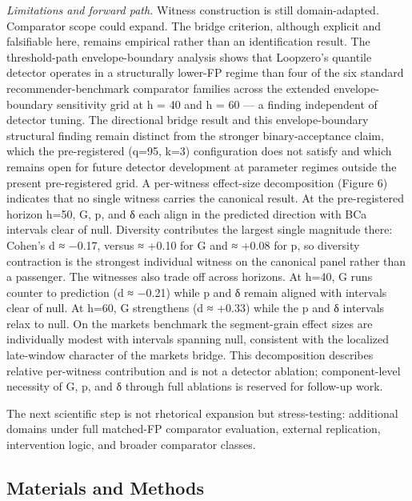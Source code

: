 \documentclass[
  11pt,
]{article}
\begin{document}
\emph{Limitations and forward path.} Witness construction is still
domain-adapted. Comparator scope could expand. The bridge criterion,
although explicit and falsifiable here, remains empirical rather than an
identification result. The threshold-path envelope-boundary analysis
shows that Loopzero's quantile detector operates in a structurally
lower-FP regime than four of the six standard recommender-benchmark
comparator families across the extended envelope-boundary sensitivity
grid at h = 40 and h = 60 --- a finding independent of detector tuning.
The directional bridge result and this envelope-boundary structural
finding remain distinct from the stronger binary-acceptance claim, which
the pre-registered (q=95, k=3) configuration does not satisfy and which
remains open for future detector development at parameter regimes
outside the present pre-registered grid. A per-witness effect-size
decomposition (Figure 6) indicates that no single witness carries the
canonical result. At the pre-registered horizon h=50, G, p, and δ each
align in the predicted direction with BCa intervals clear of null.
Diversity contributes the largest single magnitude there: Cohen's d ≈
−0.17, versus ≈ +0.10 for G and ≈ +0.08 for p, so diversity contraction
is the strongest individual witness on the canonical panel rather than a
passenger. The witnesses also trade off across horizons. At h=40, G runs
counter to prediction (d ≈ −0.21) while p and δ remain aligned with
intervals clear of null. At h=60, G strengthens (d ≈ +0.33) while the p
and δ intervals relax to null. On the markets benchmark the
segment-grain effect sizes are individually modest with intervals
spanning null, consistent with the localized late-window character of
the markets bridge. This decomposition describes relative per-witness
contribution and is not a detector ablation; component-level necessity
of G, p, and δ through full ablations is reserved for follow-up work.

The next scientific step is not rhetorical expansion but stress-testing:
additional domains under full matched-FP comparator evaluation, external
replication, intervention logic, and broader comparator classes.

\subsection{Materials and Methods}\label{materials-and-methods}
\end{document}
